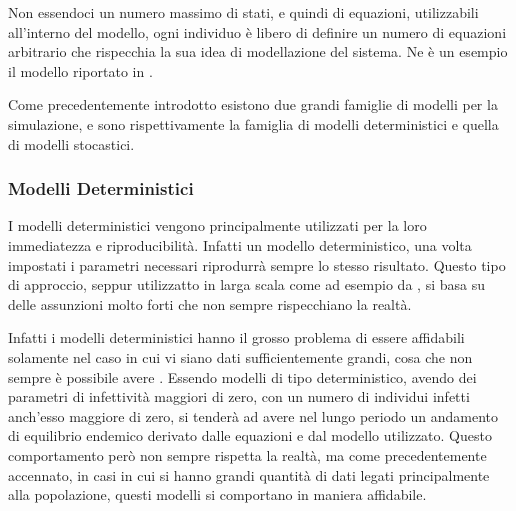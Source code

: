 Non essendoci un numero massimo di stati, e quindi di equazioni, utilizzabili
all'interno del modello, ogni individuo è libero di definire un numero
di equazioni arbitrario che rispecchia la sua idea di modellazione del 
sistema. Ne è un esempio il modello riportato in \cite{Giordano2020}.

Come precedentemente introdotto esistono due grandi famiglie di modelli
per la simulazione, e sono rispettivamente la famiglia di modelli deterministici
e quella di modelli stocastici.

\newpage

\subsubsection{Modelli Deterministici}
I modelli deterministici vengono principalmente utilizzati 
per la loro immediatezza e riproducibilità. Infatti un modello
deterministico, una volta impostati i parametri necessari
riprodurrà sempre lo stesso risultato. Questo tipo di approccio, 
seppur utilizzatto in larga scala come ad esempio da \cite{Bjornstad2020}
\cite{Mwalili2020}, \cite{Giordano2020} si basa su delle assunzioni molto forti
che non sempre rispecchiano la realtà. 

Infatti i modelli deterministici hanno il grosso problema di
essere affidabili solamente nel caso in cui vi siano dati 
sufficientemente grandi, cosa che non sempre è possibile
avere \cite{wiki:Compartmental_models_in_epidemiology}.
Essendo modelli di tipo deterministico, avendo dei parametri 
di infettività maggiori di zero, con un numero di individui infetti
anch'esso maggiore di zero, si tenderà ad avere nel lungo
periodo un andamento di equilibrio endemico derivato 
dalle equazioni e dal modello utilizzato. Questo comportamento
però non sempre rispetta la realtà, ma come precedentemente 
accennato, in casi in cui si hanno grandi quantità di dati 
legati principalmente alla popolazione, questi modelli si 
comportano in maniera affidabile.


